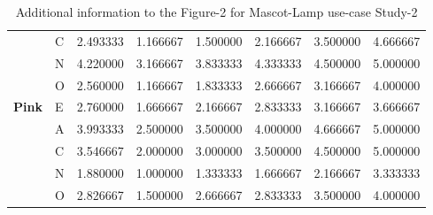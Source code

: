 \begin{table}[H]
\begin{center}
\begin{tabular}{ |p{2cm}| p{0.5cm}|p{1.5cm}|p{1.5cm}| p{1.5cm}|p{1.5cm}|p{1.5cm}| p{1.5cm}| }
&C &2.493333 & 1.166667 &1.500000 &2.166667 &3.500000 &4.666667\\
&N &4.220000 & 3.166667 &3.833333 &4.333333 &4.500000 &5.000000\\
&O &2.560000 & 1.166667 &1.833333 &2.666667 &3.166667 &4.000000\\
 \hline 
 \hline 
 \multirow{5}{*}{\textbf{Pink}} 
&E &2.760000 & 1.666667 &2.166667 &2.833333 &3.166667 &3.666667\\
&A &3.993333 & 2.500000 &3.500000 &4.000000 &4.666667 &5.000000\\
&C &3.546667 & 2.000000 &3.000000 &3.500000 &4.500000 &5.000000\\
&N &1.880000 & 1.000000 &1.333333 &1.666667 &2.166667 &3.333333\\
&O &2.826667 & 1.500000 &2.666667 &2.833333 &3.500000 &4.000000\\
 \hline 
\end{tabular}
\end{center}
\caption{Additional information to the Figure-2 for Mascot-Lamp use-case Study-2}
\label{table:medianML2}
\end{table}


